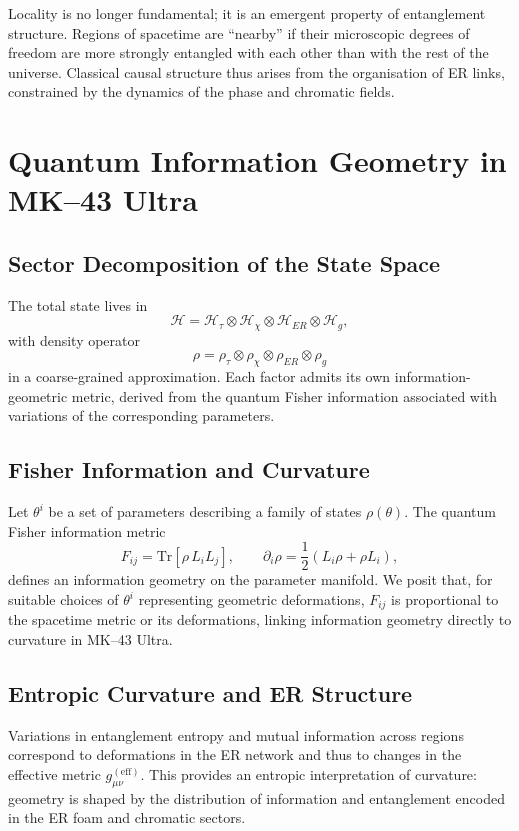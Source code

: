 Locality is no longer fundamental; it is an emergent property of entanglement structure.
Regions of spacetime are ``nearby'' if their microscopic degrees of freedom are more strongly entangled with each other than with the rest of the universe.
Classical causal structure thus arises from the organisation of ER links, constrained by the dynamics of the phase and chromatic fields.

\chapter{Quantum Information Geometry in MK--43 Ultra}

\section{Sector Decomposition of the State Space}

The total state lives in
\[
  \mathcal{H} = \mathcal{H}_\tau \otimes \mathcal{H}_\chi \otimes \mathcal{H}_{ER} \otimes \mathcal{H}_g,
\]
with density operator
\[
  \rho = \rho_\tau \otimes \rho_\chi \otimes \rho_{ER} \otimes \rho_g
\]
in a coarse-grained approximation.
Each factor admits its own information-geometric metric, derived from the quantum Fisher information associated with variations of the corresponding parameters.

\section{Fisher Information and Curvature}

Let $\theta^i$ be a set of parameters describing a family of states $\rho(\theta)$.
The quantum Fisher information metric
\[
  F_{ij} = \mathrm{Tr}\left[\rho\, L_i L_j\right], \qquad \partial_i \rho = \frac{1}{2}\left(L_i\rho + \rho L_i\right),
\]
defines an information geometry on the parameter manifold.
We posit that, for suitable choices of $\theta^i$ representing geometric deformations, $F_{ij}$ is proportional to the spacetime metric or its deformations, linking information geometry directly to curvature in MK--43 Ultra.

\section{Entropic Curvature and ER Structure}

Variations in entanglement entropy and mutual information across regions correspond to deformations in the ER network and thus to changes in the effective metric $g_{\mu\nu}^{\mathrm{(eff)}}$.
This provides an entropic interpretation of curvature:
geometry is shaped by the distribution of information and entanglement encoded in the ER foam and chromatic sectors.

